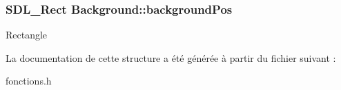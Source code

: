 \subsubsection[{\texorpdfstring{background\+Pos}{backgroundPos}}]{\setlength{\rightskip}{0pt plus 5cm}S\+D\+L\+\_\+\+Rect Background\+::background\+Pos}\hypertarget{structBackground_a81fdaea521be13c6634186f72b105e33}{}\label{structBackground_a81fdaea521be13c6634186f72b105e33}
Rectangle 

La documentation de cette structure a été générée à partir du fichier suivant \+:\begin{DoxyCompactItemize}
\item 
fonctions.\+h\end{DoxyCompactItemize}

